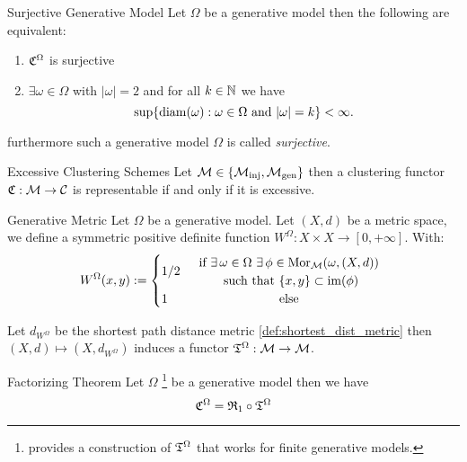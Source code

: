 \begin{proposition}{Surjective Generative Model}{}
\newresult
Let $\Omega$ be a generative model then the following are equivalent:
\begin{enumerate}
    \item $\mathfrak{C}^\Omega$ is surjective
    \item $\exists \omega \in \Omega$ with $|\omega| = 2$ and for all $k \in \mathbb N$ we have 
    $$
    \sup\{\mathrm{diam}(\omega): \omega \in \Omega \text{ and } |\omega| = k\} < \infty.
    $$ 
\end{enumerate}
furthermore such a generative model $\Omega$ is called \emph{surjective}.
\end{proposition}





\begin{theorem}{Excessive Clustering Schemes}{}
Let $\mathcal{M} \in \{{\mathcal{M}_\mathrm{inj}}, {\mathcal{M}_\mathrm{gen}}\}$ then a clustering functor $\mathfrak{C}: \mathcal{M} \to \mathcal{C}$ is representable if and only if it is excessive.
\end{theorem}

\begin{definition}{Generative Metric \cite{Carlsson2010}}{}
Let $\Omega$ be a generative model. Let $(X,d)$ be a metric space, we define a symmetric positive definite function $W^\Omega: X \times X \to [0,+\infty]$. With:
\begin{equation*}
W^\Omega(x,y) := \begin{cases}
    1/2 & 
    \begin{array}{cc}
         \text{if } \exists \, \omega \in \Omega \ \exists \, \phi \in \mor_{\M}(\omega, (X,d))\\
         \text{ such that } \{x,y\} \subset \image(\phi)
    \end{array}\\
    1 & \hfil \text{else}
\end{cases}
\end{equation*}
\end{definition}




\begin{myremark}{}{}
Let $d_{W^\Omega}$ be the shortest path distance metric \ref{def:shortest_dist_metric} then $(X,d) \mapsto (X,d_{W^\Omega})$ induces a functor $\mathfrak{T}^\Omega: \mathcal{M} \to \mathcal{M}$.
\end{myremark}

\begin{theorem}{Factorizing Theorem}{}
Let $\Omega$ \footnote{\cite{Carlsson2010} provides a construction of $\mathfrak{T}^\Omega$ that works for finite generative models.} be a generative model then we have
\begin{equation*}
\mathfrak{C}^\Omega = \mathfrak{R}_1 \circ \mathfrak{T}^\Omega
\end{equation*}
\end{theorem}

